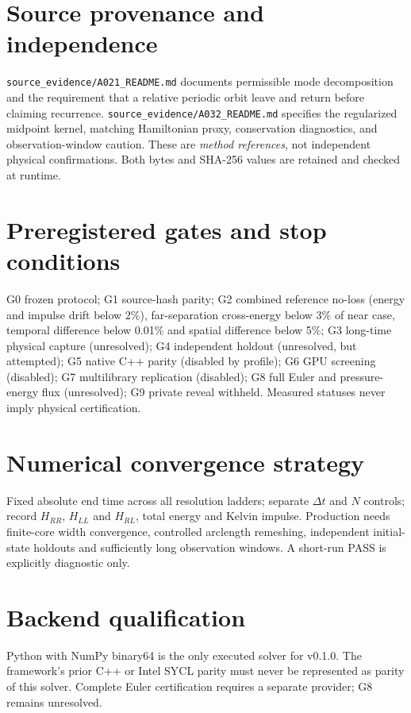 \documentclass[11pt,a4paper]{article}
\begin{document}
\section{Source provenance and independence}
\texttt{source\_evidence/A021\_README.md} documents permissible mode decomposition and the requirement that a relative periodic orbit leave and return before claiming recurrence. \texttt{source\_evidence/A032\_README.md} specifies the regularized midpoint kernel, matching Hamiltonian proxy, conservation diagnostics, and observation-window caution. These are \emph{method references}, not independent physical confirmations. Both bytes and SHA-256 values are retained and checked at runtime.
\section{Preregistered gates and stop conditions}
G0 frozen protocol; G1 source-hash parity; G2 combined reference no-loss (energy and impulse drift below 2\%), far-separation cross-energy below 3\% of near case, temporal difference below 0.01\% and spatial difference below 5\%; G3 long-time physical capture (unresolved); G4 independent holdout (unresolved, but attempted); G5 native C++ parity (disabled by profile); G6 GPU screening (disabled); G7 multilibrary replication (disabled); G8 full Euler and pressure-energy flux (unresolved); G9 private reveal withheld. Measured statuses never imply physical certification.

\section{Numerical convergence strategy}
Fixed absolute end time across all resolution ladders; separate $\Delta t$ and $N$ controls; record $H_{RR}$, $H_{LL}$ and $H_{RL}$, total energy and Kelvin impulse. Production needs finite-core width convergence, controlled arclength remeshing, independent initial-state holdouts and sufficiently long observation windows. A short-run PASS is explicitly diagnostic only.
\section{Backend qualification}
Python with NumPy binary64 is the only executed solver for v0.1.0. The framework's prior C++ or Intel SYCL parity must never be represented as parity of this solver. Complete Euler certification requires a separate provider; G8 remains unresolved.
\end{document}

